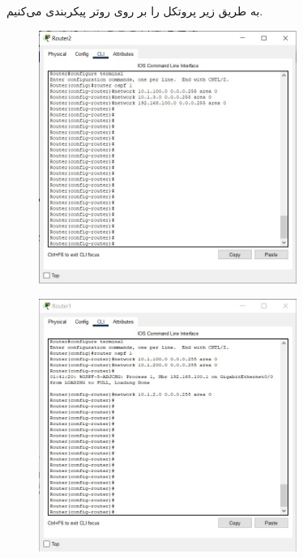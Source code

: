 \documentclass{article}
\begin{document}
\section{}%
به طریق زیر پروتکل  را بر روی روتر پیکربندی می‌کنیم.
\begin{figure}[H]
    \centering
    \includegraphics[width=0.75\textwidth]{figures/10.jpg}
    \caption{}
    \label{fig:fig1}
\end{figure}
\begin{figure}[H]
    \centering
    \includegraphics[width=0.75\textwidth]{figures/11.jpg}
    \caption{}
    \label{fig:fig1}
\end{figure}
\end{document}
